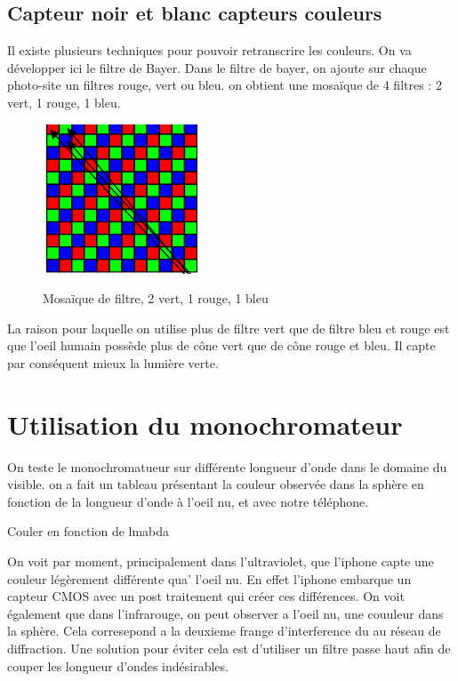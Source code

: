\documentclass{article}
\begin{document}
\subsection{Capteur noir et blanc capteurs couleurs}
Il existe plusieurs techniques pour pouvoir retranscrire les couleurs. On va développer ici le filtre de Bayer.
Dans le filtre de bayer, on ajoute sur chaque photo-site un filtres rouge, vert ou bleu. on obtient une mosaïque de 4 filtres : 2 vert, 1 rouge, 1 bleu.

\begin{figure}[H]
\centering
\includegraphics[scale=0.7]{mosaique_filtre.png}
\label{fig:mosaique}
\caption{Mosaïque de filtre, 2 vert, 1 rouge, 1 bleu}
\end{figure}

La raison pour laquelle on utilise plus de filtre vert que de filtre bleu et rouge est que l'oeil humain possède plus de cône vert que de cône rouge et bleu. Il capte par conséquent mieux la lumière verte.

\section{Utilisation du monochromateur}
On teste le monochromatueur sur différente longueur d'onde dans le domaine du visible.
on a fait un tableau présentant la couleur observée dans la sphère en fonction de la longueur d'onde à l'oeil nu, et avec notre téléphone.
\begin{table}[H]
\caption{Couler en fonction de lmabda}
\label{tab:lambda}
\end{table}

On voit par moment, principalement dans l'ultraviolet, que l'iphone capte une couleur légèrement différente qua' l'oeil nu. En effet l'iphone embarque un capteur CMOS avec un post traitement qui créer ces différences.
On voit également que dans l'infrarouge, on peut observer a l'oeil nu, une couuleur dans la sphère. 
Cela corresepond a la deuxieme frange d'interference du au réseau de diffraction. Une solution pour éviter cela est d'utiliser un filtre passe haut afin de couper les longueur d'ondes indésirables.
\end{document}

